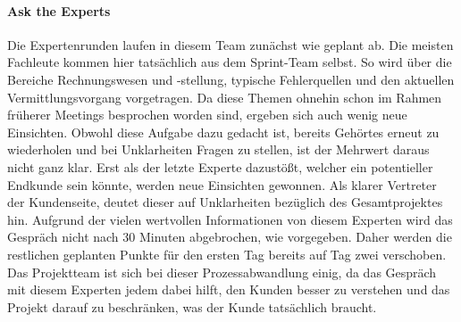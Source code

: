 %
%
%

\paragraph{Ask the Experts}
Die Expertenrunden laufen in diesem Team zunächst wie geplant ab. Die meisten Fachleute kommen hier tatsächlich aus dem Sprint-Team selbst. So wird über die Bereiche Rechnungswesen und -stellung, typische Fehlerquellen und den aktuellen Vermittlungsvorgang vorgetragen. Da diese Themen ohnehin schon im Rahmen früherer Meetings besprochen worden sind, ergeben sich auch wenig neue Einsichten. Obwohl diese Aufgabe dazu gedacht ist, bereits Gehörtes erneut zu wiederholen und bei Unklarheiten Fragen zu stellen, ist der Mehrwert daraus nicht ganz klar. Erst als der letzte Experte dazustößt, welcher ein potentieller Endkunde sein könnte, werden neue Einsichten gewonnen. Als klarer Vertreter der Kundenseite, deutet dieser auf Unklarheiten bezüglich des Gesamtprojektes hin. Aufgrund der vielen wertvollen Informationen von diesem Experten wird das Gespräch nicht nach 30 Minuten abgebrochen, wie vorgegeben. Daher werden die restlichen geplanten Punkte für den ersten Tag bereits auf Tag zwei verschoben. Das Projektteam ist sich bei dieser Prozessabwandlung einig, da das Gespräch mit diesem Experten jedem dabei hilft, den Kunden besser zu verstehen und das Projekt darauf zu beschränken, was der Kunde tatsächlich braucht.

